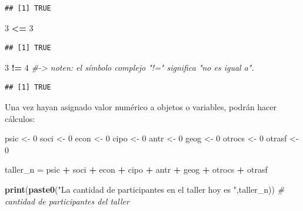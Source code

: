 \documentclass[
]{article}
\newenvironment{Shaded}{\begin{snugshade}}{\end{snugshade}}
\newcommand{\CommentTok}[1]{\textcolor[rgb]{0.56,0.35,0.01}{\textit{#1}}}
\newcommand{\DecValTok}[1]{\textcolor[rgb]{0.00,0.00,0.81}{#1}}
\newcommand{\FunctionTok}[1]{\textcolor[rgb]{0.13,0.29,0.53}{\textbf{#1}}}
\newcommand{\NormalTok}[1]{#1}
\newcommand{\OtherTok}[1]{\textcolor[rgb]{0.56,0.35,0.01}{#1}}
\newcommand{\SpecialCharTok}[1]{\textcolor[rgb]{0.81,0.36,0.00}{\textbf{#1}}}
\newcommand{\StringTok}[1]{\textcolor[rgb]{0.31,0.60,0.02}{#1}}
\begin{document}
\begin{verbatim}
## [1] TRUE
\end{verbatim}

\begin{Shaded}
\begin{Highlighting}[]
\DecValTok{3} \SpecialCharTok{\textless{}=} \DecValTok{3}
\end{Highlighting}
\end{Shaded}

\begin{verbatim}
## [1] TRUE
\end{verbatim}

\begin{Shaded}
\begin{Highlighting}[]
\DecValTok{3} \SpecialCharTok{!=} \DecValTok{4} \CommentTok{\#{-}\textgreater{} noten: el símbolo complejo "!=" significa "no es igual a".}
\end{Highlighting}
\end{Shaded}

\begin{verbatim}
## [1] TRUE
\end{verbatim}

Una vez hayan asignado valor numérico a objetos o variables, podrán
hacer cálculos:

\begin{Shaded}
\begin{Highlighting}[]
\NormalTok{psic }\OtherTok{\textless{}{-}} \DecValTok{0}
\NormalTok{soci }\OtherTok{\textless{}{-}} \DecValTok{0}
\NormalTok{econ }\OtherTok{\textless{}{-}} \DecValTok{0}
\NormalTok{cipo }\OtherTok{\textless{}{-}} \DecValTok{0}
\NormalTok{antr }\OtherTok{\textless{}{-}} \DecValTok{0}
\NormalTok{geog }\OtherTok{\textless{}{-}} \DecValTok{0}
\NormalTok{otrocs }\OtherTok{\textless{}{-}} \DecValTok{0}
\NormalTok{otrasf }\OtherTok{\textless{}{-}} \DecValTok{0}

\NormalTok{taller\_n }\OtherTok{=}\NormalTok{ psic }\SpecialCharTok{+}\NormalTok{ soci }\SpecialCharTok{+}\NormalTok{ econ }\SpecialCharTok{+}\NormalTok{ cipo }\SpecialCharTok{+}\NormalTok{ antr }\SpecialCharTok{+}\NormalTok{ geog }\SpecialCharTok{+}\NormalTok{ otrocs }\SpecialCharTok{+}\NormalTok{ otrasf}

\FunctionTok{print}\NormalTok{(}\FunctionTok{paste0}\NormalTok{(}\StringTok{"La cantidad de participantes en el taller hoy es "}\NormalTok{,taller\_n)) }\CommentTok{\# cantidad de participantes del taller}
\end{Highlighting}
\end{Shaded}
\end{document}
